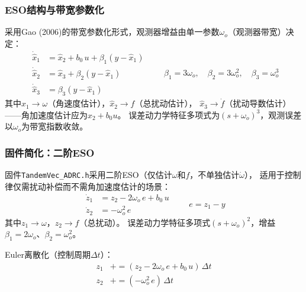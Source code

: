 \subsubsection{ESO结构与带宽参数化}

采用Gao (2006)的带宽参数化形式，观测器增益由单一参数$\omega_o$（观测器带宽）决定：
\begin{equation}
    \boxed{
    \begin{aligned}
        \dot{\hat{x}}_1 &= \hat{x}_2 + b_0\,u + \beta_1(y - \hat{x}_1) \\
        \dot{\hat{x}}_2 &= \hat{x}_3 + \beta_2(y - \hat{x}_1) \\
        \dot{\hat{x}}_3 &= \beta_3(y - \hat{x}_1)
    \end{aligned}
    }
    \qquad
    \beta_1 = 3\omega_o,\quad
    \beta_2 = 3\omega_o^2,\quad
    \beta_3 = \omega_o^3
    \label{eq:eso_continuous}
\end{equation}
其中$\hat{x}_1\to\omega$（角速度估计），$\hat{x}_2\to f$（总扰动估计），
$\hat{x}_3\to\dot f$（扰动导数估计）——角加速度估计应为$\hat{x}_2 + b_0 u$。
误差动力学特征多项式为$(s+\omega_o)^3$，观测误差以$\omega_o$为带宽指数收敛。

\subsubsection{固件简化：二阶ESO}

固件\texttt{TandemVec\_ADRC.h}采用二阶ESO（仅估计$\omega$和$f$，不单独估计$\dot\omega$），
适用于控制律仅需扰动补偿而不需角加速度估计的场景：
\begin{equation}
    \boxed{
    \begin{aligned}
        \dot{z}_1 &= z_2 - 2\omega_o\,e + b_0\,u \\
        \dot{z}_2 &= -\omega_o^2\,e
    \end{aligned}
    }
    \qquad e = z_1 - y
    \label{eq:eso2_continuous}
\end{equation}
其中$z_1\to\omega$，$z_2\to f$（总扰动）。
误差动力学特征多项式$(s+\omega_o)^2$，增益$\beta_1=2\omega_o$、$\beta_2=\omega_o^2$。

Euler离散化（控制周期$\Delta t$）：
\begin{equation}
    \begin{aligned}
        z_1 &\mathrel{+}= (z_2 - 2\omega_o\,e + b_0\,u)\,\Delta t \\
        z_2 &\mathrel{+}= (-\omega_o^2\,e)\,\Delta t
    \end{aligned}
    \label{eq:eso2_discrete}
\end{equation}

